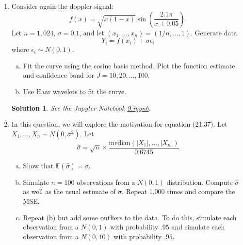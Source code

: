 \documentclass[10pt]{article}
\newtheorem*{sol}{Solution}
\newcommand{\E}{\mathbb{E}}
\begin{document}
\begin{enumerate}
\item[(9)] Consider again the doppler signal:
\[
f(x) = \sqrt{x(1-x)}\sin\left(\frac{2.1 \pi}{x+0.05}\right).
\]
Let $n=1,024$, $\sigma=0.1$, and let $(x_1,\ldots,x_n)=(1/n,\ldots,1)$. Generate
data
\[
Y_i = f(x_i) + \sigma \epsilon_i
\]
where $\epsilon_i \sim N(0,1)$.
\begin{enumerate}[(a)]
\item Fit the curve using the cosine basis method. Plot the function estimate
and confidence band for $J = 10,20, \ldots,100$.
\item Use Haar wavelets to fit the curve.
\end{enumerate}

\begin{sol}
See the Jupyter Notebook
\href{https://github.com/ajrasmus/some_of_statistics/blob/main/chapter_21/9.ipynb}{9.ipynb}.
\end{sol}

\item[(11)] In this question, we will explore the motivation for equation (21.37). Let
$X_1,\ldots,X_n \sim N(0,\sigma^2)$. Let
\[
\hat \sigma = \sqrt{n} \times \frac{\text{median}(|X_1|,\ldots,|X_n|)}{0.6745}
\]
\begin{enumerate}[(a)]
\item Show that $\E(\hat \sigma) = \sigma$.
\item Simulate $n=100$ observations from a $N(0,1)$ distribution. Compute
$\hat \sigma$ as well as the usual estimate of $\sigma$. Repeat 1,000 times and compare
the MSE.
\item Repeat (b) but add some outliers to the data. To do this, simulate
each observation from a $N(0,1)$ with probability $.95$ and simulate each
observation from a $N(0,10)$ with probability $.95$.
\end{enumerate}

\end{enumerate}
\end{document}
